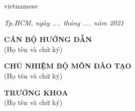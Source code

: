 \begin{titlepage}
\begin{otherlanguage*}{vietnamese}
    \begin{flushright}
        \textit{Tp.HCM, ngày .... tháng .... năm 2021}
    \end{flushright}

    \begin{center}
        \begin{minipage}[t]{0.45\textwidth}
            \center\textbf{CÁN BỘ HƯỚNG DẪN}\\
            (Họ tên và chữ ký)
            \vspace{3cm}
        \end{minipage}
        \noindent
        \begin{minipage}[t]{0.45\textwidth}
            \center\textbf{CHỦ NHIỆM BỘ MÔN ĐÀO TẠO}\\
            (Họ tên và chữ ký)
            \vspace{3cm}
        \end{minipage}
        \begin{minipage}[t]{0.90\textwidth}
            \center\textbf{TRƯỞNG KHOA}\\
            (Họ tên và chữ ký)
            \vspace{3cm}
        \end{minipage}
    \end{center}

\end{otherlanguage*}
\vfill
\end{titlepage}
